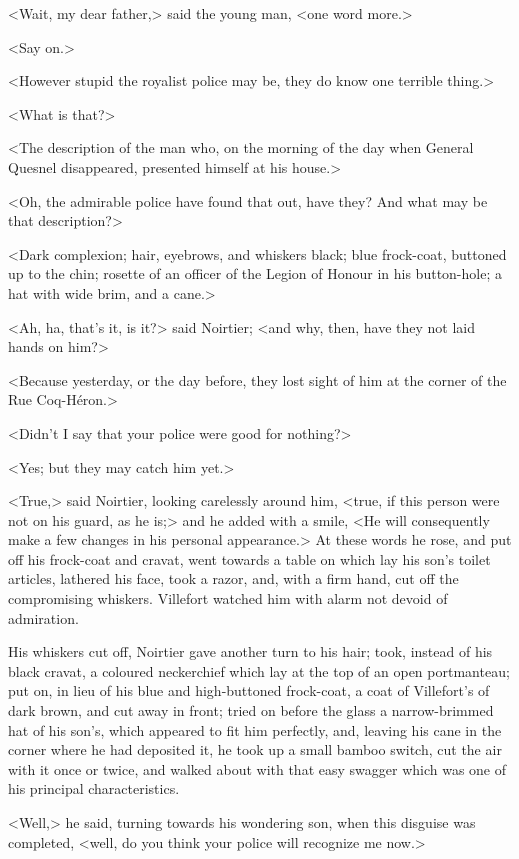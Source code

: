  <Wait, my dear father,> said the young man, <one word more.> 

 <Say on.> 

 <However stupid the royalist police may be, they do know one terrible thing.> 

 <What is that?> 

 <The description of the man who, on the morning of the day when General Quesnel disappeared, presented himself at his house.> 

 <Oh, the admirable police have found that out, have they? And what may be that description?> 

 <Dark complexion; hair, eyebrows, and whiskers black; blue frock-coat, buttoned up to the chin; rosette of an officer of the Legion of Honour in his button-hole; a hat with wide brim, and a cane.> 

 <Ah, ha, that's it, is it?> said Noirtier; <and why, then, have they not laid hands on him?>  
 
 
 <Because yesterday, or the day before, they lost sight of him at the corner of the Rue Coq-Héron.> 

 <Didn't I say that your police were good for nothing?> 

 <Yes; but they may catch him yet.> 

 <True,> said Noirtier, looking carelessly around him, <true, if this person were not on his guard, as he is;> and he added with a smile, <He will consequently make a few changes in his personal appearance.> At these words he rose, and put off his frock-coat and cravat, went towards a table on which lay his son's toilet articles, lathered his face, took a razor, and, with a firm hand, cut off the compromising whiskers. Villefort watched him with alarm not devoid of admiration. 

 His whiskers cut off, Noirtier gave another turn to his hair; took, instead of his black cravat, a coloured neckerchief which lay at the top of an open portmanteau; put on, in lieu of his blue and high-buttoned frock-coat, a coat of Villefort's of dark brown, and cut away in front; tried on before the glass a narrow-brimmed hat of his son's, which appeared to fit him perfectly, and, leaving his cane in the corner where he had deposited it, he took up a small bamboo switch, cut the air with it once or twice, and walked about with that easy swagger which was one of his principal characteristics. 

 <Well,> he said, turning towards his wondering son, when this disguise was completed, <well, do you think your police will recognize me now.> 

